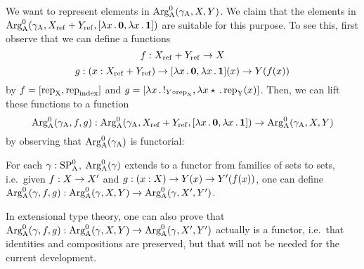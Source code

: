\documentclass{article}
\begin{document}
We want to represent elements in $\text{Arg}^{0}_{\mathrm{A}}(\gamma_{\mathrm{A}}, X, Y)$. We claim that
the elements in $\text{Arg}^{0}_{\mathrm{A}}(\gamma_{\mathrm{A}}, X_{\mathrm{ref}} + Y_{\mathrm{ref}}, [\lambda x\,.\,\mathbf{0},
\lambda x\,.\,\mathbf{1}])$ are suitable for this purpose. To see this,
first observe that we can define a functions
\[
f : X_{\mathrm{ref}} + Y_{\mathrm{ref}} \to X
\]
%
%
\[
g : (x : X_{\mathrm{ref}} + Y_{\mathrm{ref}}) \to
    [\lambda x\,.\,\mathbf{0}, \lambda x\,.\,\mathbf{1}](x)
      \to Y(f(x))
\]
%
by $f = [\text{rep}_{\mathrm{X}}, \text{rep}_{\mathrm{index}}]$ and $g = [\lambda x\,.\,!_{Y \circ
  \text{rep}_{\mathrm{X}}}, \lambda x \star\,.\, \text{rep}_{\mathrm{Y}}(x)]$. Then, we can lift these
functions to a function
%
\[
\text{Arg}^{0}_{\mathrm{A}}(\gamma_{\mathrm{A}}, f, g) : \text{Arg}^{0}_{\mathrm{A}}(\gamma_{\mathrm{A}}, X_{\mathrm{ref}} +Y_{\mathrm{ref}}, [\lambda x\,.\,\mathbf{0}, \lambda x\,.\,\mathbf{1}]) \to
                       \text{Arg}^{0}_{\mathrm{A}}(\gamma_{\mathrm{A}}, X, Y)
\]
%
by observing that $\text{Arg}^{0}_{\mathrm{A}}(\gamma_{\mathrm{A}})$ is functorial:

\begin{lemma} %
  For each $\gamma : \text{SP}^{0}_{\mathrm{A}}$, $\text{Arg}^{0}_{\mathrm{A}}(\gamma)$ extends to a functor from
  families of sets to sets, i.e.\ given $f : X \to X'$ and $g : (x :
  X) \to Y(x) \to Y'(f(x))$, one can define $\text{Arg}^{0}_{\mathrm{A}}(\gamma, f, g) :
  \text{Arg}^{0}_{\mathrm{A}}(\gamma, X, Y) \to \text{Arg}^{0}_{\mathrm{A}}(\gamma, X', Y')$.
\end{lemma}
\begin{remark}
  In extensional type theory, one can also prove that $\text{Arg}^{0}_{\mathrm{A}}(\gamma,
  f, g) : \text{Arg}^{0}_{\mathrm{A}}(\gamma, X, Y) \to \text{Arg}^{0}_{\mathrm{A}}(\gamma, X', Y')$
  actually is a functor, i.e.\ that identities and compositions are
  preserved, but that will not be needed for the current development.
\end{remark}
\end{document}
